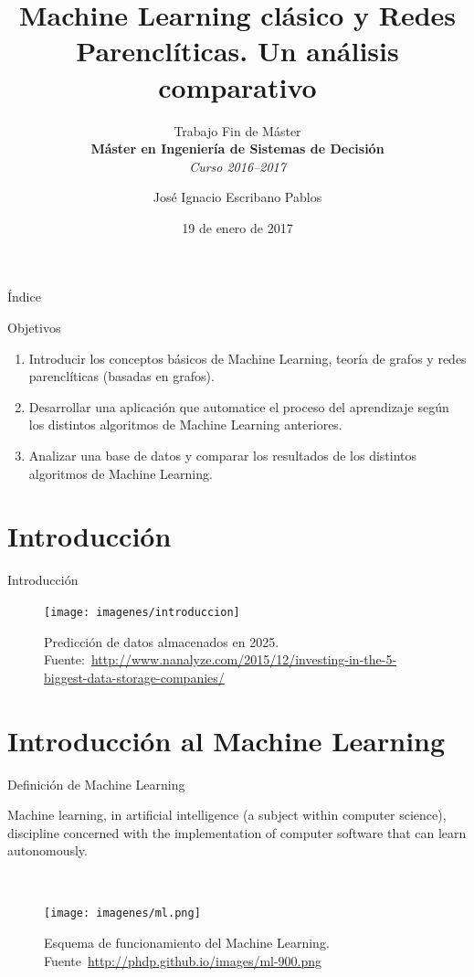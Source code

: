 \documentclass[hyperref={unicode}]{beamer}
\title{Machine Learning clásico y Redes Parenclíticas. Un análisis comparativo}
\subtitle{Trabajo Fin de Máster \\ \textbf{Máster en Ingeniería de Sistemas de Decisión} \\ \textit{Curso 2016--2017}}
\author{José Ignacio Escribano Pablos}
\institute{\begin{tabular}{c}
Ana Elizabeth García Sipols \\
Miguel Romance del Río     
\end{tabular}}
\date{19 de enero de 2017}
\begin{document}
\setcounter{showProgressBar}{0}
\setcounter{showSlideNumbers}{0}

\frame{\titlepage}

\begin{frame}{Índice}
	\tableofcontents
\end{frame}

\setcounter{framenumber}{0}
\setcounter{showProgressBar}{1}
\setcounter{showSlideNumbers}{1}

\begin{frame}{Objetivos}
	\begin{enumerate}
		\item Introducir los conceptos básicos de Machine Learning, teoría de grafos y redes parenclíticas (basadas en grafos).
		
		\item Desarrollar una aplicación que automatice el proceso del aprendizaje según los distintos algoritmos de Machine Learning anteriores.
		
		\item Analizar una base de datos y comparar los resultados de los distintos algoritmos de Machine Learning.
	\end{enumerate}
\end{frame}

\section{Introducción}
\begin{frame}{Introducción}
	\begin{figure}
			\begin{center}
			\texttt{[image: imagenes/introduccion]}
			\caption{Predicción de datos almacenados en 2025. Fuente:~\url{http://www.nanalyze.com/2015/12/investing-in-the-5-biggest-data-storage-companies/}}
			\end{center}
		\end{figure}
\end{frame}

\section{Introducción al Machine Learning}
\begin{frame}{Definición de Machine Learning}
	\begin{fancyquotes}
		Machine learning, in artificial intelligence (a subject within computer science), discipline concerned with the implementation of computer software that can learn autonomously.
	\end{fancyquotes}

	\ \\

	\begin{figure}
		\begin{center}
			\texttt{[image: imagenes/ml.png]}
			\caption{Esquema de funcionamiento del Machine Learning. Fuente~\url{http://phdp.github.io/images/ml-900.png}}
		\end{center}
	\end{figure}
\end{frame}
\end{document}
